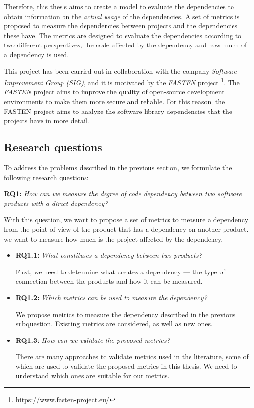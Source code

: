 \blankl
Therefore, this thesis aims to create a model to evaluate the dependencies to obtain information on the \textit{actual usage} of the dependencies. A set of metrics is proposed to measure the dependencies between projects and the dependencies these have. The metrics are designed to evaluate the dependencies according to two different perspectives, the code affected by the dependency and how much of a dependency is used.

This project has been carried out in collaboration with the company \textit{Software Improvement Group (SIG)}, and it is motivated by the \textit{FASTEN} project \footnote{\url{https://www.fasten-project.eu/}}. The \textit{FASTEN} project aims to improve the quality of open-source development environments to make them more secure and reliable. For this reason, the FASTEN project aims to analyze the software library dependencies that the projects have in more detail.

\subsection{Research questions}
To address the problems described in the previous section, we formulate the following research questions:

\blankl
\textbf{RQ1:} \textit{How can we measure the degree of code dependency between two software products with a direct dependency?}

\blankls
With this question, we want to propose a set of metrics to measure a dependency from the point of view of the product that has a dependency on another product. we want to measure how much is the project affected by the dependency.

\begin{itemize}
  \item \textbf{RQ1.1:} \textit{What constitutes a dependency between two products?}

  First, we need to determine what creates a dependency — the type of connection between the products and how it can be measured.

  \item \textbf{RQ1.2:} \textit{Which metrics can be used to measure the dependency?}

  We propose metrics to measure the dependency described in the previous subquestion. Existing metrics are considered, as well as new ones.

  \item \textbf{RQ1.3:} \textit{How can we validate the proposed metrics?}

  There are many approaches to validate metrics used in the literature, some of which are used to validate the proposed metrics in this thesis. We need to understand which ones are suitable for our metrics.
\end{itemize}

